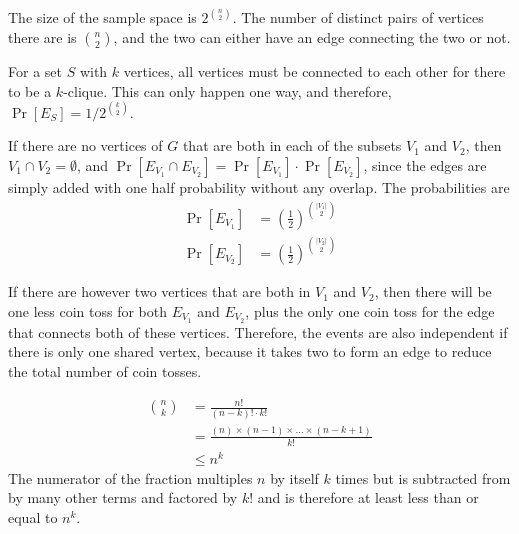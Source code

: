 \documentclass[11pt]{article}
\begin{document}
\begin{solution}
    
\begin{Parts}
    
\Part The size of the sample space is $2^{\binom{n}{2}}$. The number of distinct 
pairs of vertices there are is $\binom{n}{2}$, and the two can either have an 
edge connecting the two or not. 

\Part For a set $S$ with $k$ vertices, all vertices must be connected to each
other for there to be a $k$-clique. This can only happen one way, and therefore,
$\Pr[E_S] = 1 / 2^{\binom{k}{2}}$.

\Part If there are no vertices of $G$ that are both in each of the subsets $V_1$
and $V_2$, then $V_1 \cap V_2 = \emptyset$, and $\Pr[E_{V_1} \cap E_{V_2}] = 
\Pr[E_{V_1}] \cdot \Pr[E_{V_2}]$, since the edges are simply added with one half 
probability without any overlap. The probabilities are 
\[
    \begin{split}
        \Pr[E_{V_1}] &= \left( \frac{1}{2} \right)^{\binom{|V_1|}{2}} \\
        \Pr[E_{V_2}] &= \left( \frac{1}{2} \right)^{\binom{|V_2|}{2}}
    \end{split}
\]

If there are however two vertices that are both in $V_1$ and $V_2$, then there 
will be one less coin toss for both $E_{V_1}$ and $E_{V_2}$, plus the only one
coin toss for the edge that connects both of these vertices. Therefore, the 
events are also independent if there is only one shared vertex, because it 
takes two to form an edge to reduce the total number of coin tosses. 

\Part
\[
    \begin{split}
        \binom{n}{k} &= \frac{n!}{(n-k)! \cdot k!} \\
        &= \frac{(n) \times (n-1) \times \dots \times (n-k+1)}{k!} \\
        &\leq n^k
    \end{split}
\]
The numerator of the fraction multiples $n$ by itself $k$ times but is subtracted
from by many other terms and factored by $k!$ and is therefore at least less than 
or equal to $n^k$.


\end{Parts}
\end{solution}
\end{document}
